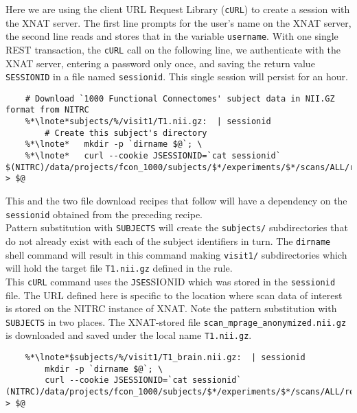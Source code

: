 \indent {} Here we are using the client URL Request Library (\texttt{cURL}) to create a session with the XNAT server. The first line prompts for the user's name on the XNAT server, the second line reads and stores that in the variable \texttt{username}. With one single REST transaction, the \texttt{cURL} call on the following line, we authenticate with the XNAT server, entering a password only once, and saving the return value \texttt{SESSIONID} in a file named \texttt{sessionid}. This single session will persist for an hour.
	
\begin{lstlisting}	
	# Download `1000 Functional Connectomes' subject data in NII.GZ format from NITRC
	%*\lnote*subjects/%/visit1/T1.nii.gz:  | sessionid
		# Create this subject's directory
	%*\lnote*	mkdir -p `dirname $@`; \
	%*\lnote*	curl --cookie JSESSIONID=`cat sessionid` $(NITRC)/data/projects/fcon_1000/subjects/$*/experiments/$*/scans/ALL/resources/NIfTI/files/scan_mprage_anonymized.nii.gz > $@

\end{lstlisting}

\indent {} This and the two file download recipes that follow will have a dependency on the \texttt{sessionid} obtained from the preceding recipe. \\ 
\indent {} Pattern substitution with \texttt{SUBJECTS} will create the \texttt{subjects/} subdirectories that do not already exist with each of the subject identifiers in turn. The \texttt{dirname} shell command will result in this command making \texttt{visit1/} subdirectories which will hold the target file \texttt{T1.nii.gz} defined in the rule. \\
\indent {} This \texttt{cURL} command uses the \texttt{JSES}SIONID which was stored in the \texttt{sessionid} file. The URL defined here is specific to the location where scan data of interest is stored on the NITRC instance of XNAT. Note the pattern substitution with \texttt{SUBJECTS} in two places. The XNAT-stored file \texttt{scan_mprage_anonymized.nii.gz} is downloaded and saved under the local name \texttt{T1.nii.gz}.

\begin{lstlisting}
	%*\lnote*$subjects/%/visit1/T1_brain.nii.gz:  | sessionid
		mkdir -p `dirname $@`; \
		curl --cookie JSESSIONID=`cat sessionid` (NITRC)/data/projects/fcon_1000/subjects/$*/experiments/$*/scans/ALL/resources/NIfTI/files/scan_mprage_skullstripped.nii.gz > $@
\end{lstlisting}

